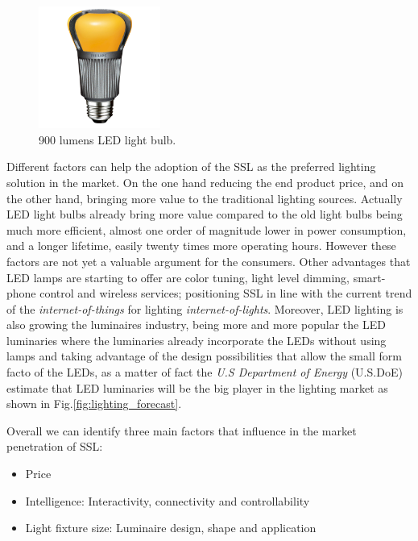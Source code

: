 \vspace{5mm} %


\begin{figure}[!h]
\centering
\includegraphics[width=4cm]{./0_intro/img/enduraled-12w.jpg}
\caption{900 lumens LED light bulb.}
\label{fig:l_prize}
\end{figure}

Different factors can help the adoption of the SSL as the preferred lighting solution in the market. On the one hand reducing the end product price, and on the other hand, bringing more value to the traditional lighting sources. Actually LED light bulbs already bring more value compared to the old light bulbs being much more efficient, almost one order of magnitude lower in power consumption, and a longer lifetime, easily twenty times more operating hours. However these factors are not yet a valuable argument for the consumers. Other advantages that LED lamps are starting to offer are color tuning, light level dimming, smart-phone control and wireless services; positioning SSL in line with the current trend of the \emph{internet-of-things} for lighting \emph{internet-of-lights}. Moreover, LED lighting is also growing the luminaires industry, being more and more popular the LED luminaries where the luminaries already incorporate the LEDs without using lamps and taking advantage of the design possibilities that allow the small form facto of the LEDs, as a matter of fact the \emph{U.S Department of Energy} (U.S.DoE) estimate that LED luminaries will be the big player in the lighting market as shown in Fig.\ref{fig:lighting_forecast}.

Overall we can identify three main factors that influence in the market penetration of SSL:
\begin{itemize}
  \item Price
  \item Intelligence: Interactivity, connectivity and controllability\
  \item Light fixture size: Luminaire design, shape and application
\end{itemize}

